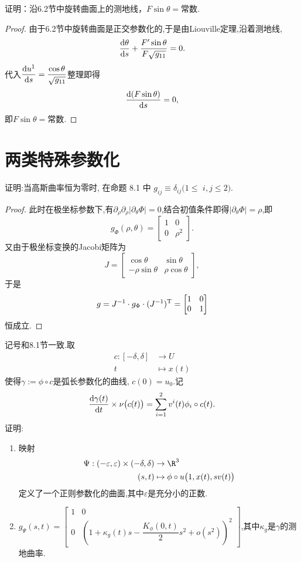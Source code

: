 	\begin{excise}
		证明：沿6.2节中旋转曲面上的测地线，$F\sin\theta=$常数.
	\end{excise}
	\begin{proof}
		由于6.2节中旋转曲面是正交参数化的,于是由Liouville定理,沿着测地线,
		$$
		\frac{\mathrm{d} \theta}{\mathrm{d} s}+\frac{F'\sin\theta}{F\sqrt{g_{11}}}=0.
		$$
		代入$\dfrac{\mathrm{d} u^{1}}{\mathrm{d} s}=\dfrac{\cos \theta}{\sqrt{g_{11}}}$整理即得
		$$
		\frac{\mathrm{d} (F\sin\theta)}{\mathrm{d} s}=0,
		$$
		即$F\sin\theta=$常数.
	\end{proof}

\section{两类特殊参数化}
\begin{excise}\label{8.1}
		证明:当高斯曲率恒为零时, 在命题 8.1 中 $g_{i j} \equiv \delta_{i j}(1 \leqslant$ $i, j \leqslant 2)$.
	\end{excise}
	\begin{proof}
		此时在极坐标参数下,有$\partial_{\rho}\partial_{\rho}|\partial_{\theta}\Phi|=0$,结合初值条件即得$|\partial_{\theta}\Phi|=\rho$,即
		$$
		g_{\Phi}(\rho,\theta)=\begin{bmatrix}
			1&0\\
			0&\rho^{2}
		\end{bmatrix}.
		$$
		又由于极坐标变换的Jacobi矩阵为
		$$
		J=
		\begin{bmatrix}
			\cos\theta&\sin\theta\\
			-\rho\sin\theta&\rho\cos\theta
		\end{bmatrix},
		$$
		于是
		$$
		g=J^{-1}\cdot g_{\Phi}\cdot (J^{-1})^{\mathrm{T}}=\begin{bmatrix}
			1&0\\
			0&1
		\end{bmatrix}
		$$
		恒成立.
	\end{proof}
	\begin{excise}
		记号和8.1节一致.取
		\begin{align*}
		c:[-\delta,\delta]&\to U\\
		t&\mapsto x(t)
		\end{align*}
		使得$\gamma:=\phi\circ c$是弧长参数化的曲线, $c(0)=u_{0}$.记
		$$
		\frac{\mathrm{d}\gamma(t)}{\mathrm{d} t}\times\nu\bigl(c(t)\bigr)=\sum_{i=1}^{2}v^{i}(t)\phi_{i}\circ c(t).
		$$
		证明:
		\begin{enumerate}[label=(\roman*)]
			\item 映射
			\begin{align*}
			\Psi:(-\varepsilon,\varepsilon)\times(-\delta,\delta)&\to \R^{3}\\
			(s,t)&\mapsto \phi\circ u\bigl(1,x(t),sv(t)\bigr)
		\end{align*}
			定义了一个正则参数化的曲面,其中$\varepsilon$是充分小的正数.
			\item $g_{\Psi}(s,t)=\begin{bmatrix}
				1&0\\
				0&\left( 1+\kappa_{g}(t)s-\dfrac{K_{\phi}(0,t)}{2}s^{2}+o(s^{2}) \right)^{2}
			\end{bmatrix}$,其中$\kappa_{g}$是$\gamma$的测地曲率.
		\end{enumerate}
	\end{excise}
